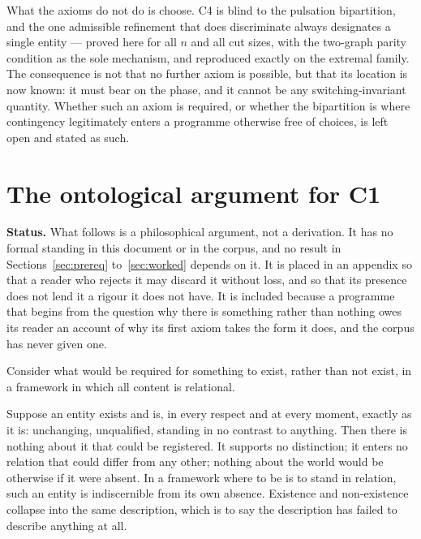 \documentclass[11pt,a4paper]{article}
\begin{document}
What the axioms do not do is choose. C4 is blind to the pulsation bipartition, and the one admissible refinement that does discriminate always designates a single entity --- proved here for all $n$ and all cut sizes, with the two-graph parity condition as the sole mechanism, and reproduced exactly on the extremal family. The consequence is not that no further axiom is possible, but that its location is now known: it must bear on the phase, and it cannot be any switching-invariant quantity. Whether such an axiom is required, or whether the bipartition is where contingency legitimately enters a programme otherwise free of choices, is left open and stated as such.

\appendix

\section{The ontological argument for C1}
\label{app:ontology}

\textbf{Status.} What follows is a philosophical argument, not a derivation. It has no formal standing in this document or in the corpus, and no result in Sections~\ref{sec:prereq} to~\ref{sec:worked} depends on it. It is placed in an appendix so that a reader who rejects it may discard it without loss, and so that its presence does not lend it a rigour it does not have. It is included because a programme that begins from the question why there is something rather than nothing owes its reader an account of why its first axiom takes the form it does, and the corpus has never given one.

\medskip

Consider what would be required for something to exist, rather than not exist, in a framework in which all content is relational.

Suppose an entity exists and is, in every respect and at every moment, exactly as it is: unchanging, unqualified, standing in no contrast to anything. Then there is nothing about it that could be registered. It supports no distinction; it enters no relation that could differ from any other; nothing about the world would be otherwise if it were absent. In a framework where to be is to stand in relation, such an entity is indiscernible from its own absence. Existence and non-existence collapse into the same description, which is to say the description has failed to describe anything at all.
\end{document}
